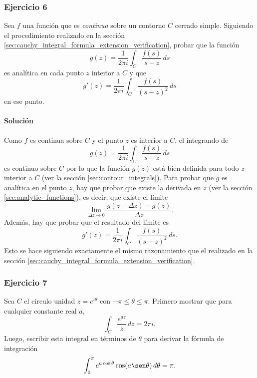 \documentclass[a4paper]{report}
\begin{document}
\subsubsection*{Ejercicio 6}

Sea \(f\) una función que es \emph{continua} sobre un contorno \(C\) cerrado simple. Siguiendo el procedimiento realizado en la sección \ref{sec:cauchy_integral_formula_extension_verification}, probar que la función
\[
 g(z)=\frac{1}{2\pi i}\int_C\frac{f(s)}{s-z}\,ds
\]
es analítica en cada punto \(z\) interior a \(C\) y que 
\[
 g'(z)=\frac{1}{2\pi i}\int_C\frac{f(s)}{(s-z)^2}\,ds
\]
en ese punto.

\paragraph{Solución} Como \(f\) es continua sobre \(C\) y el punto \(z\) es interior a \(C\), el integrando de
\[
 g(z)=\frac{1}{2\pi i}\int_C\frac{f(s)}{s-z}\,ds
\]
es continuo sobre \(C\) por lo que la función \(g(z)\) está bien definida para todo \(z\) interior a \(C\) (ver la sección \ref{sec:contour_integrals}). Para probar que \(g\) es analítica en el punto \(z\), hay que probar que existe la derivada en \(z\) (ver la sección \ref{sec:analytic_functions}), es decir, que existe el límite
\[
 \lim_{\Delta z\to0}\frac{g(z+\Delta z)-g(z)}{\Delta z}.
\]
Además, hay que probar que el resultado del límite es
\[
 g'(z)=\frac{1}{2\pi i}\int_C\frac{f(s)}{(s-z)^2}\,ds.
\]
Esto se hace siguiendo exactamente el mismo razonamiento que el realizado en la sección \ref{sec:cauchy_integral_formula_extension_verification}.

\subsubsection*{Ejercicio 7}

Sea \(C\) el círculo unidad \(z=e^{i\theta}\) con \(-\pi\leq\theta\leq\pi\). Primero mostrar que para cualquier constante real \(a\),
\[
 \int_C\frac{e^{az}}{z}\,dz=2\pi i.
\]
Luego, escribir esta integral en términos de \(\theta\) para derivar la fórmula de integración
\[
 \int_0^\pi e^{a\cos\theta}\cos(a\sen\theta)\,d\theta=\pi.
\]
\end{document}
